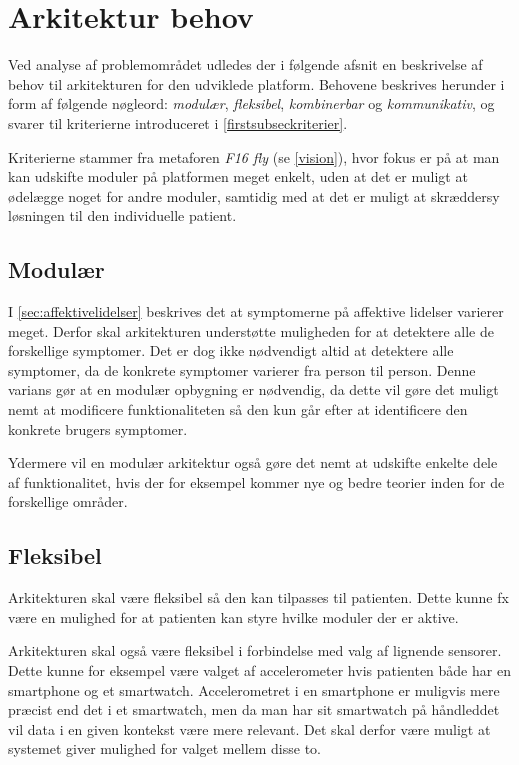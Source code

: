 \section{Arkitektur behov}\label{arkitekturkrav}
Ved analyse af problemområdet udledes der i følgende afsnit en beskrivelse af behov til arkitekturen for den udviklede platform.
Behovene beskrives herunder i form af følgende nøgleord: \textit{modulær}, \textit{fleksibel}, \textit{kombinerbar} og \textit{kommunikativ}, og svarer til kriterierne introduceret i \cref{firstsubseckriterier}.

Kriterierne stammer fra metaforen \textit{F16 fly} (se \cref{vision}), hvor fokus er på at man kan udskifte moduler på platformen meget enkelt, uden at det er muligt at ødelægge noget for andre moduler, samtidig med at det er muligt at skræddersy løsningen til den individuelle patient.


\subsection{Modulær}\label{arkitekturkrav::modulaer}
I \cref{sec:affektivelidelser} beskrives det at symptomerne på affektive lidelser varierer meget.
Derfor skal arkitekturen understøtte muligheden for at detektere alle de forskellige symptomer.
Det er dog ikke nødvendigt altid at detektere alle symptomer, da de konkrete symptomer varierer fra person til person.
Denne varians gør at en modulær opbygning er nødvendig, da dette vil gøre det muligt nemt at modificere funktionaliteten så den kun går efter at identificere den konkrete brugers symptomer.

Ydermere vil en modulær arkitektur også gøre det nemt at udskifte enkelte dele af funktionalitet, hvis der for eksempel kommer nye og bedre teorier inden for de forskellige områder.

\subsection{Fleksibel}\label{arkitekturkrav::fleksibel}
Arkitekturen skal være fleksibel så den kan tilpasses til patienten.
Dette kunne fx være en mulighed for at patienten kan styre hvilke moduler der er aktive.

Arkitekturen skal også være fleksibel i forbindelse med valg af lignende sensorer.
Dette kunne for eksempel være valget af accelerometer hvis patienten både har en smartphone og et smartwatch.
Accelerometret i en smartphone er muligvis mere præcist end det i et smartwatch, men da man har sit smartwatch på håndleddet vil data i en given kontekst være mere relevant.
Det skal derfor være muligt at systemet giver mulighed for valget mellem disse to.

